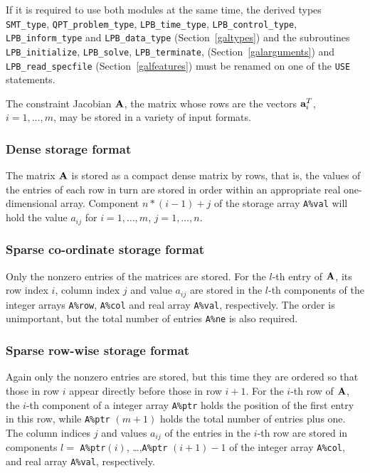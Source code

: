 \documentclass{galahad}
\newcommand{\packagename}{LPB}
\begin{document}
\medskip

\noindent
If it is required to use both modules at the same time, the derived types
{\tt SMT\_type},
{\tt QPT\_problem\_type},
{\tt \packagename\_time\_type},
{\tt \packagename\_control\_type},
{\tt \packagename\_inform\_type}
and
{\tt \packagename\_data\_type}
(Section~\ref{galtypes})
and the subroutines
{\tt \packagename\_initialize},
{\tt \packagename\_\-solve},
{\tt \packagename\_terminate},
(Section~\ref{galarguments})
and
{\tt \packagename\_read\_specfile}
(Section~\ref{galfeatures})
must be renamed on one of the {\tt USE} statements.


\galmatrix
The constraint Jacobian ${\mathbf{A}}$, the matrix
whose rows are the vectors ${\mathbf{a}}_{i}^{T}$, $i = 1, \ldots , m$,
may be stored in a variety of input formats.

\subsubsection{Dense storage format}\label{dense}
The matrix ${\mathbf{A}}$ is stored as a compact
dense matrix by rows, that is, the values of the entries of each row in turn are
stored in order within an appropriate real one-dimensional array.
Component $n \ast (i-1) + j$ of the storage array {\tt A\%val} will hold the
value $a_{ij}$ for $i = 1, \ldots , m$, $j = 1, \ldots , n$.

\subsubsection{Sparse co-ordinate storage format}\label{coordinate}
Only the nonzero entries of the matrices are stored. For the
$l$-th entry of ${\mathbf{A}}$, its row index $i$, column index $j$
and value $a_{ij}$
are stored in the $l$-th components of the integer arrays {\tt A\%row},
{\tt A\%col} and real array {\tt A\%val}, respectively.
The order is unimportant, but the total
number of entries {\tt A\%ne} is also required.

\subsubsection{Sparse row-wise storage format}\label{rowwise}
Again only the nonzero entries are stored, but this time
they are ordered so that those in row $i$ appear directly before those
in row $i+1$. For the $i$-th row of ${\mathbf{A}}$, the $i$-th component of a
integer array {\tt A\%ptr} holds the position of the first entry in this row,
while {\tt A\%ptr} $(m+1)$ holds the total number of entries plus one.
The column indices $j$ and values $a_{ij}$ of the entries in the $i$-th row
are stored in components
$l =$ {\tt A\%ptr}$(i)$, \ldots ,{\tt A\%ptr} $(i+1)-1$ of the
integer array {\tt A\%col}, and real array {\tt A\%val}, respectively.
\end{document}

